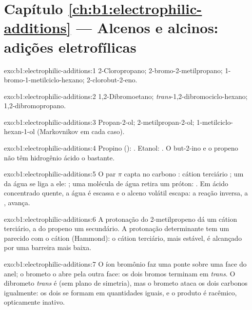 \section*{Capítulo \ref{ch:b1:electrophilic-additions} --- Alcenos e alcinos: adições eletrofílicas}

\begin{solution}{exo:b1:electrophilic-additions:1}
2-Cloropropano; 2-bromo-2-metilpropano; 1-bromo-1-metilciclo-hexano;
2-clorobut-2-eno.
\end{solution}

\begin{solution}{exo:b1:electrophilic-additions:2}
1,2-Dibromoetano; \textit{trans}-1,2-dibromociclo-hexano;
1,2-dibromopropano.
\end{solution}

\begin{solution}{exo:b1:electrophilic-additions:3}
Propan-2-ol; 2-metilpropan-2-ol; 1-metilciclo-hexan-1-ol (Markovnikov em
cada caso).
\end{solution}

\begin{solution}{exo:b1:electrophilic-additions:4}
Propino (): . Etanol:
. O but-2-ino e o propeno não têm
hidrogênio ácido o bastante.
\end{solution}

\begin{solution}{exo:b1:electrophilic-additions:5}
O par $\pi$ capta  no carbono : cátion terciário
; um  da água se liga a ele: ;
uma molécula de água retira um próton: . Em ácido
concentrado quente, a água é escassa e o alceno volátil escapa: a reação
inversa, a , avança.
\end{solution}

\begin{solution}{exo:b1:electrophilic-additions:6}
A protonação do 2-metilpropeno dá um cátion terciário, a do propeno um
secundário. A protonação determinante tem um 
parecido com o cátion (Hammond): o cátion terciário, mais estável, é
alcançado por uma barreira mais baixa.
\end{solution}

\begin{solution}{exo:b1:electrophilic-additions:7}
O íon bromônio faz uma ponte sobre uma face do anel; o brometo o abre
pela outra face: os dois bromos terminam em \textit{trans}. O dibrometo
\textit{trans} é  (sem plano de simetria), mas o brometo ataca os
dois carbonos igualmente: os dois  se formam em quantidades
iguais, e o produto é racêmico, opticamente inativo.
\end{solution}

